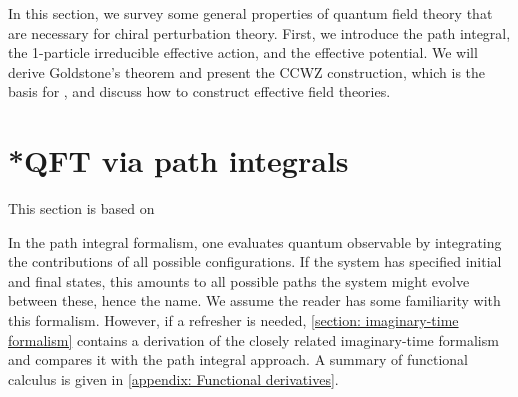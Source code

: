 In this section, we survey some general properties of quantum field theory that are necessary for chiral perturbation theory.
First, we introduce the path integral, the 1-particle irreducible effective action, and the effective potential.
We will derive Goldstone's theorem and present the CCWZ construction, which is the basis for \chpt, and discuss how to construct effective field theories.




\section{*QFT via path integrals}
\label{section: path integral}

This section is based on \autocite{peskinIntroductionQuantumField1995,weinbergQuantumTheoryFields1995,weinbergQuantumTheoryFields1996,schwartzQuantumFieldTheory2013}

In the path integral formalism, one evaluates quantum observable by integrating the contributions of all possible configurations.
If the system has specified initial and final states, this amounts to all possible paths the system might evolve between these, hence the name.
We assume the reader has some familiarity with this formalism. 
However, if a refresher is needed, \autoref{section: imaginary-time formalism} contains a derivation of the closely related imaginary-time formalism and compares it with the path integral approach.
A summary of functional calculus is given in \autoref{appendix: Functional derivatives}.

